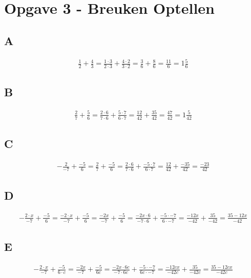 \documentclass[fleqn]{article}
\begin{document}
\clearpage
\section{Opgave 3 - Breuken Optellen}
\subsection{A}
\begin{align*}
    \frac{1}{2} + \frac{4}{3} = \frac{1\cdot3}{2\cdot3} + \frac{4\cdot2}{3\cdot2} = \frac{3}{6} + \frac{8}{6} = \frac{11}{6} = 1\frac{5}{6}
\end{align*}

\subsection{B}
\begin{align*}
    \frac{2}{7} + \frac{5}{6} = \frac{2\cdot6}{7\cdot6} + \frac{5\cdot7}{6\cdot7} = \frac{12}{42}+\frac{35}{42} = \frac{47}{42} = 1\frac{5}{42} 
\end{align*}

\subsection{C}
\begin{align*}
    -\frac{2}{-7} + \frac{-5}{6}=\frac{2}{7}+\frac{-5}{6}=\frac{2\cdot6}{7\cdot6}+\frac{-5\cdot7}{6\cdot7}=\frac{12}{42}+\frac{-35}{42}=\frac{-23}{42}
\end{align*}

\subsection{D}
\begin{align*}
    -\frac{2\cdot x}{-7} + \frac{-5}{6}=\frac{-2\cdot x}{-7} + \frac{-5}{6} = \frac{-2x}{-7} + \frac{-5}{6} = \frac{-2x\cdot6}{-7\cdot6} + \frac{-5\cdot-7}{6\cdot-7}= \frac{-12x}{-42} + \frac{35}{-42} = \frac{35-12x}{-42}
\end{align*}

\subsection{E}
\begin{align*}
    -\frac{2 \cdot x}{-7} + \frac{-5}{6\cdot c}= \frac{-2x}{-7}+\frac{-5}{6c}=\frac{-2x\cdot6c}{-7\cdot6c} + \frac{-5\cdot-7}{6c\cdot-7} = \frac{-12cx}{-42c} + \frac{35}{-42c} = \frac{35-12cx}{-42c}
\end{align*}
\end{document}
